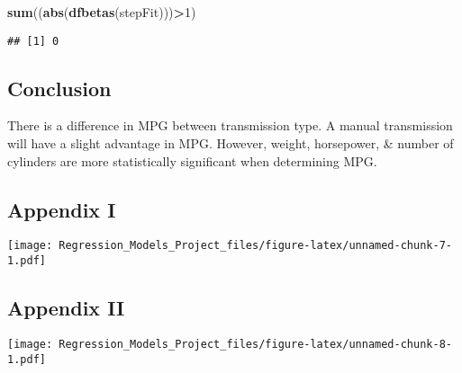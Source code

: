 \documentclass[]{article}
\newenvironment{Shaded}{\begin{snugshade}}{\end{snugshade}}
\newcommand{\KeywordTok}[1]{\textcolor[rgb]{0.13,0.29,0.53}{\textbf{#1}}}
\newcommand{\DecValTok}[1]{\textcolor[rgb]{0.00,0.00,0.81}{#1}}
\newcommand{\OperatorTok}[1]{\textcolor[rgb]{0.81,0.36,0.00}{\textbf{#1}}}
\newcommand{\NormalTok}[1]{#1}
\begin{document}
\begin{Shaded}
\begin{Highlighting}[]
\KeywordTok{sum}\NormalTok{((}\KeywordTok{abs}\NormalTok{(}\KeywordTok{dfbetas}\NormalTok{(stepFit)))}\OperatorTok{>}\DecValTok{1}\NormalTok{)}
\end{Highlighting}
\end{Shaded}

\begin{verbatim}
## [1] 0
\end{verbatim}

\subsection{Conclusion}\label{conclusion}

There is a difference in MPG between transmission type. A manual
transmission will have a slight advantage in MPG. However, weight,
horsepower, \& number of cylinders are more statistically significant
when determining MPG.

\subsection{Appendix I}\label{appendix-i}

\texttt{[image: Regression\_Models\_Project\_files/figure-latex/unnamed-chunk-7-1.pdf]}

\subsection{Appendix II}\label{appendix-ii}

\texttt{[image: Regression\_Models\_Project\_files/figure-latex/unnamed-chunk-8-1.pdf]}
\end{document}
